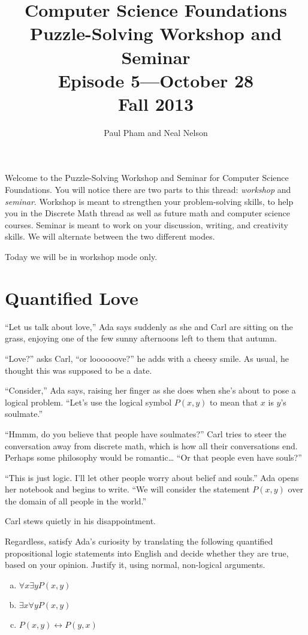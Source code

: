 \documentclass{article}
\title{Computer Science Foundations\\ Puzzle-Solving Workshop and Seminar\\
\large{Episode 5---October 28}\\
Fall 2013}
\author{Paul Pham and Neal Nelson}
\begin{document}
\maketitle

Welcome to the Puzzle-Solving Workshop and Seminar for
Computer Science Foundations. You will notice there are
two parts to this thread: \emph{workshop} and \emph{seminar}.
Workshop is meant to strengthen your problem-solving skills,
to help you in the Discrete Math thread as well as future
math and computer science courses. Seminar is meant to
work on your discussion, writing, and creativity skills.
We will alternate between the two different modes.

Today we will be in workshop mode only.

\section{Quantified Love}

``Let us talk about love,'' Ada says suddenly as she and Carl are sitting
on the grass, enjoying one of the few sunny afternoons left to them that
autumn.

``Love?'' asks Carl, ``or loooooove?'' he adds with a cheesy smile.
As usual, he thought this was supposed to be a date.

``Consider,'' Ada says, raising her finger as she does when she's about to
pose a logical problem. ``Let's use the logical symbol $P(x,y)$ to mean that
$x$ is $y$'s soulmate.''

``Hmmm, do you believe that people have soulmates?''
Carl tries to steer the conversation away from discrete math, which is how all
their conversations end. Perhaps some philosophy would be romantic\ldots
``Or that people even have souls?''

``This is just logic. I'll let other people worry about belief and souls.''
Ada opens her notebook and begins to write.
``We will consider the statement $P(x,y)$ over the domain of all people in
the world.''

Carl stews quietly in his disappointment.

Regardless, satisfy Ada's curiosity by
translating the following quantified propositional logic statements into
English and decide whether they are true, based on your opinion. Justify it,
using normal, non-logical arguments.

\begin{enumerate}[(a)]
\item
$\forall x \exists y P(x,y)$
\item
$\exists x \forall y P(x,y)$
\item
$P(x,y) \leftrightarrow P(y,x)$
\end{enumerate}
\end{document}
